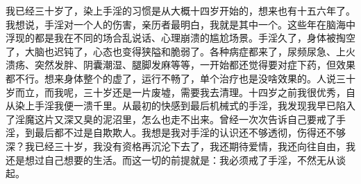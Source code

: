 \begin{case}
    我已经三十岁了，染上手淫的习惯是从大概十四岁开始的，想来也有十五六年了。我想说，手淫对一个人的伤害，亲历者最明白，我就是其中一个。这些年在脑海中浮现的都是我在不同的场合乱说话、心理崩溃的尴尬场景。手淫久了，身体被掏空了，大脑也迟钝了，心态也变得狭隘和脆弱了。各种病症都来了，尿频尿急、上火溃疡、突然发胖、阴囊潮湿、腿脚发麻等等，一开始都还觉得要对症下药，但效果都不行。想来身体整个的虚了，运行不畅了，单个治疗也是没啥效果的。人说三十岁而立，而我呢，三十岁还是一片废墟，需要我去清理。十四岁之前我很优秀，自从染上手淫我便一溃千里。从最初的快感到最后机械式的手淫，我发现我早已陷入了淫魔这片又深又臭的泥沼里，怎么也走不出来。曾经一次次告诉自己要戒了手淫，到最后都不过是自欺欺人。我想是我对手淫的认识还不够透彻，伤得还不够深？我已经三十岁，我没有资格再沉沦下去了，我还期待爱情，我还向往自由，我还是想过自己想要的生活。而这一切的前提就是：我必须戒了手淫，不然无从谈起。

\end{case}
